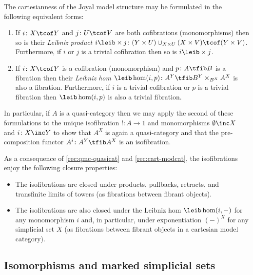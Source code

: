 \begin{rec}\label{rec:cart-modcat}
The cartesianness of the Joyal model structure may be formulated in the following equivalent forms:
  \begin{enumerate}
    \item If $i\colon X\tcof Y$ and $j\colon U\tcof V$ are both cofibrations (monomorphisms) then so is their {\em Leibniz product\/} $i\leib\times j\colon (Y\times U)\cup_{X\times U} (X\times V)\tcof (Y\times V)$. Furthermore, if $i$  or $j$ is a trivial cofibration then so is $i\leib\times j$.
    \item If $i\colon X\tcof Y$ is a cofibration (monomorphism) and $p\colon A\tfib B$ is a fibration then their {\em Leibniz hom\/} $\leib\hom(i,p)\colon A^Y\tfib B^Y\times_{B^X} A^X$ is also a fibration. Furthermore, if $i$ is a trivial cofibration or $p$ is a trivial fibration then $\leib\hom(i,p)$ is also a trivial fibration.
  \end{enumerate}
  In particular, if $A$ is a quasi-category then we may apply the second of these formulations to the unique isofibration $!\colon A\to 1$ and monomorphisms $\emptyset\inc X$ and $i\colon X\inc Y$ to show that $A^X$ is again a quasi-category and that the pre-composition functor $A^i\colon A^Y\tfib A^X$ is an isofibration. 
\end{rec}

\begin{obs}\label{obs:isofibration-closure}
As a consequence of \ref{rec:qmc-quasicat} and \ref{rec:cart-modcat}, the isofibrations enjoy the following closure properties:
\begin{itemize}
\item  The isofibrations are closed under products, pullbacks, retracts, and transfinite limits of towers (as fibrations between fibrant objects).
\item The isofibrations are also closed under the Leibniz hom $\leib\hom(i,-)$ for any monomorphism $i$ and, in particular, under exponentiation $(-)^X$ for any simplicial set $X$ (as fibrations between fibrant objects in a cartesian model category).
\end{itemize}
\end{obs}

\subsection{Isomorphisms and marked simplicial sets}

